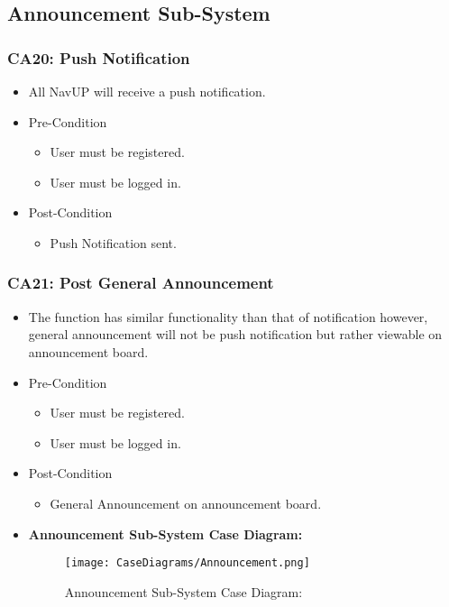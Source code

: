 \documentclass[12pt,a4paper]{article}
\begin{document}
	\subsection{Announcement Sub-System}
		\subsubsection{CA20: Push Notification}
			\begin{itemize}
				\item All NavUP will receive a push notification.
					\item Pre-Condition
						\begin{itemize}
							\item User must be registered.
							\item User must be logged in.
						\end{itemize}
					\item Post-Condition
						\begin{itemize}
							\item Push Notification sent.
						\end{itemize}
			\end{itemize}
		\subsubsection{CA21: Post General Announcement}
			\begin{itemize}
				\item The function has similar functionality than that of notification however, general announcement will not be push notification but rather viewable on announcement board.
					\item Pre-Condition
						\begin{itemize}
							\item User must be registered.
							\item User must be logged in.
						\end{itemize}
					\item Post-Condition
						\begin{itemize}
							\item General Announcement on announcement board.
						\end{itemize}
				\item \textbf{Announcement Sub-System Case Diagram:}
				\begin{figure}[H]
					\texttt{[image: CaseDiagrams/Announcement.png]}
					\caption{Announcement Sub-System Case Diagram:}
				\end{figure}
			\end{itemize}
\end{document}
